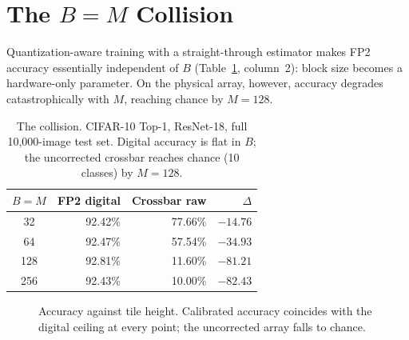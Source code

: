 \documentclass[conference,10pt]{IEEEtran}
\begin{document}
\section{The $B=M$ Collision}
\label{sec:collision}

Quantization-aware training with a straight-through estimator makes FP2
accuracy essentially independent of $B$ (Table~\ref{tab:collapse}, column~2):
block size becomes a hardware-only parameter. On the physical array, however,
accuracy degrades catastrophically with $M$, reaching chance by $M{=}128$.

\begin{table}[t]
\centering
\caption{The collision. CIFAR-10 Top-1, ResNet-18, full 10{,}000-image test
set. Digital accuracy is flat in $B$; the uncorrected crossbar reaches chance
(10 classes) by $M{=}128$.}
\label{tab:collapse}
\begin{tabular}{crrr}
\toprule
$B{=}M$ & FP2 digital & Crossbar raw & $\Delta$ \\
\midrule
32  & 92.42\% & 77.66\% & $-14.76$ \\
64  & 92.47\% & 57.54\% & $-34.93$ \\
128 & 92.81\% & 11.60\% & $-81.21$ \\
256 & 92.43\% & 10.00\% & $-82.43$ \\
\bottomrule
\end{tabular}
\end{table}

\begin{figure}[t]
\centering
{}
\caption{Accuracy against tile height. Calibrated accuracy coincides with the
digital ceiling at every point; the uncorrected array falls to chance.}
\label{fig:collapse}
\end{figure}
\end{document}
